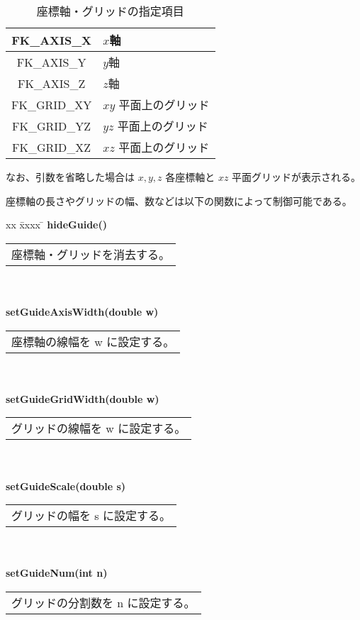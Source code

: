 \begin{table}[H]
\caption{座標軸・グリッドの指定項目}
\label{tbl:fkAxisGrid}
\begin{center}
\begin{tabular}{|c|l|}
\hline
FK\_AXIS\_X & \(x\)軸 \\ \hline
FK\_AXIS\_Y & \(y\)軸 \\ \hline
FK\_AXIS\_Z & \(z\)軸 \\ \hline
FK\_GRID\_XY & \(xy\) 平面上のグリッド \\ \hline
FK\_GRID\_YZ & \(yz\) 平面上のグリッド \\ \hline
FK\_GRID\_XZ & \(xz\) 平面上のグリッド \\ \hline
\end{tabular}
\end{center}
\end{table}

なお、引数を省略した場合は \(x,y,z\) 各座標軸と \(xz\) 平面グリッドが表示される。

座標軸の長さやグリッドの幅、数などは以下の関数によって制御可能である。

\begin{tabbing}
xx \= xxxx \= \kill
\> \textbf{hideGuide()} \\
	\> \> \begin{tabular}{p{15cm}}
		座標軸・グリッドを消去する。
	\end{tabular} \\ \\

\> \textbf{setGuideAxisWidth(double w)} \\
	\> \> \begin{tabular}{p{15cm}}
		座標軸の線幅を w に設定する。
	\end{tabular} \\ \\

\> \textbf{setGuideGridWidth(double w)} \\
	\> \> \begin{tabular}{p{15cm}}
		グリッドの線幅を w に設定する。
	\end{tabular} \\ \\

\> \textbf{setGuideScale(double s)} \\
	\> \> \begin{tabular}{p{15cm}}
		グリッドの幅を s に設定する。
	\end{tabular} \\ \\

\> \textbf{setGuideNum(int n)} \\
	\> \> \begin{tabular}{p{15cm}}
		グリッドの分割数を n に設定する。
	\end{tabular}
\end{tabbing}
